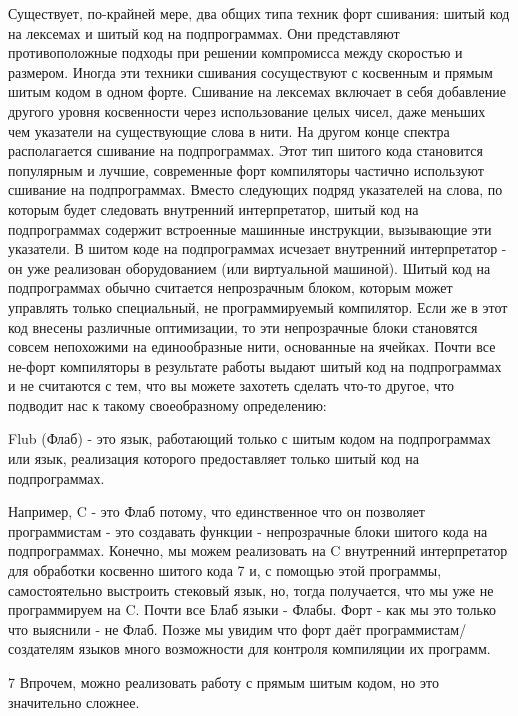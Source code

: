 Существует, по-крайней мере, два общих типа техник форт сшивания: шитый код на лексемах и шитый код на подпрограммах. Они представляют противоположные подходы при решении компромисса между скоростью и размером. Иногда эти техники сшивания сосуществуют с косвенным и прямым шитым кодом в одном форте. Сшивание на лексемах включает в себя добавление другого уровня косвенности через использование целых чисел, даже меньших чем указатели на существующие слова в нити. На другом конце спектра располагается сшивание на подпрограммах. Этот тип шитого кода становится популярным и лучшие, современные форт компиляторы частично используют сшивание на подпрограммах. Вместо следующих подряд указателей на слова, по которым будет следовать внутренний интерпретатор, шитый код на подпрограммах содержит встроенные машинные инструкции, вызывающие эти указатели. В шитом коде на подпрограммах исчезает внутренний интерпретатор - он уже реализован оборудованием (или виртуальной машиной). Шитый код на подпрограммах обычно считается непрозрачным блоком, которым может управлять только специальный, не программируемый компилятор. Если же в этот код внесены различные оптимизации, то эти непрозрачные блоки становятся совсем непохожими на единообразные нити, основанные на ячейках. Почти все не-форт компиляторы в результате работы выдают шитый код на подпрограммах и не считаются с тем, что вы можете захотеть сделать что-то другое, что подводит нас к такому своеобразному определению:

Flub (Флаб) - это язык, работающий только с шитым кодом на подпрограммах или язык, реализация которого предоставляет только шитый код на подпрограммах.

Например, C - это Флаб потому, что единственное что он позволяет программистам - это создавать функции - непрозрачные блоки шитого кода на подпрограммах. Конечно, мы можем реализовать на C внутренний интерпретатор для обработки косвенно шитого кода 7 и, с помощью этой программы, самостоятельно выстроить стековый язык, но, тогда получается, что мы уже не программируем на C. Почти все Блаб языки - Флабы. Форт - как мы это только что выяснили - не Флаб. Позже мы увидим что форт даёт программистам/создателям языков много возможности для контроля компиляции их программ.

7 Впрочем, можно реализовать работу с прямым шитым кодом, но это значительно сложнее.

